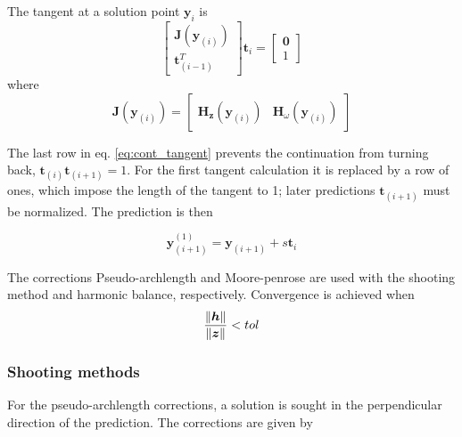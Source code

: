 The tangent at a solution point $\bm y_{i}$ is
\begin{equation}
  \label{eq:cont_tangent}
  \begin{bmatrix}
    \bm J(\bm y_{(i)}) \\ \bm t^T_{(i-1)}
  \end{bmatrix}
  \bm t_{i}
  =
  \begin{bmatrix}
    \bm 0 \\ 1
  \end{bmatrix}
\end{equation}
where
\begin{equation}
  \label{eq:cont_J}
  \bm J(\bm y_{(i)}) =
  \begin{bmatrix}
    \bm H_{\bm z}(\bm y_{(i)}) & \bm H_{\omega}(\bm y_{(i)})
  \end{bmatrix}
\end{equation}

The last row in eq. \eqref{eq:cont_tangent} prevents the continuation from
turning back, $\bm t_{(i)}\bm t_{(i+1)}=1$. For the first tangent calculation it
is replaced by a row of ones, which impose the length of the tangent to 1; later
predictions $\bm t_{(i+1)}$ must be normalized.
The prediction is then

\begin{equation}
  \label{eq:cont_pred}
  \bm y^{(1)}_{(i+1)} = \bm y_{(i+1)} + s \bm t_i
\end{equation}

The corrections Pseudo-archlength and Moore-penrose are used with the shooting
method and harmonic balance, respectively. Convergence is achieved when
\begin{equation}
  \label{eq:cont_convergence}
  \frac{\left\lVert \bm h \right\rVert}{\left\lVert \bm z \right\rVert} < tol
\end{equation}

\subsubsection{Shooting methods}
\label{sec:shooting_cont}

For the pseudo-archlength corrections, a solution is sought in the perpendicular
direction of the prediction. The corrections are given by

